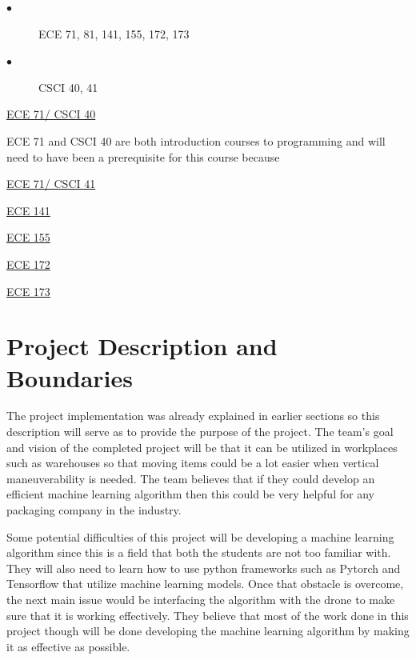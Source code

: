 \documentclass[12pt,onecolumn]{IEEEtran}			%
\begin{document}
 \begin{description}
  \item[$\bullet$ ] ECE 71, 81, 141, 155, 172, 173
  \item[$\bullet$ ] CSCI 40, 41
\end{description}
\vspace{12pt} 

\underline{ECE 71/ CSCI 40}
\vspace{6pt} 

ECE 71 and CSCI 40 are both introduction courses to programming and will need to have been a prerequisite for this course because 

\vspace{6pt}
\underline{ECE 71/ CSCI 41}
\vspace{6pt} 

\underline{ECE 141}
\vspace{6pt} 

\underline{ECE 155}
\vspace{6pt} 

\underline{ECE 172}
\vspace{6pt} 

\underline{ECE 173}
\vspace{6pt} 
 
 
\section{Project Description and Boundaries}

The project implementation was already explained in earlier sections so this description will serve as to provide the purpose of the project. The team's goal and vision of the completed project will be that it can be utilized in workplaces such as warehouses so that moving items could be a lot easier when vertical maneuverability is needed. The team believes that if they could develop an efficient machine learning algorithm then this could be very helpful for any packaging company in the industry. 

Some potential difficulties of this project will be developing a machine learning algorithm since this is a field that both the students are not too familiar with. They will also need to learn how to use python frameworks such as Pytorch and Tensorflow that utilize machine learning models. Once that obstacle is overcome, the next main issue would be interfacing the algorithm with the drone to make sure that it is working effectively. They believe that most of the work done in this project though will be done developing the machine learning algorithm by making it as effective as possible. 
\end{document}
